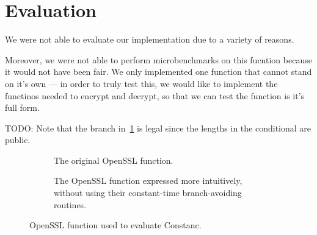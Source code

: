 \section{Evaluation}
\label{sec:evaluation}
We were not able to evaluate our implementation due to a variety of reasons.

\cite{almeida2016}

Moreover, we were not able to perform microbenchmarks on this fucntion because
it would not have been fair. We only implemented one function that cannot stand
on it's own --- in order to truly test this, we would like to implement the
functinos needed to encrypt and decrypt, so that we can test the function is
it's full form.

TODO: Note that the branch in~\ref{fig:openssl-original} is legal since the lengths in the conditional are public.

\begin{figure*}
    \centering
    \begin{subfigure}[b]{0.49\textwidth}
		\dbox{}
		\caption{The original OpenSSL function.\newline}
		\label{fig:openssl-original}
    \end{subfigure}
    \begin{subfigure}[b]{0.49\textwidth}
		\dbox{}
		\caption{The OpenSSL function expressed more intuitively, without using their constant-time branch-avoiding routines.}
		\label{fig:openssl-intuitive}
    \end{subfigure}
    \caption{OpenSSL function used to evaluate Constanc.}\label{fig:openssl}\floatspace
\end{figure*}
